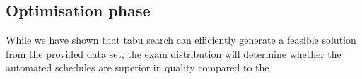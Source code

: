 \subsection{Optimisation phase}

While we have shown that tabu search can efficiently generate a feasible solution from the provided data set, the exam distribution will determine whether the automated schedules are superior in quality compared to the 



